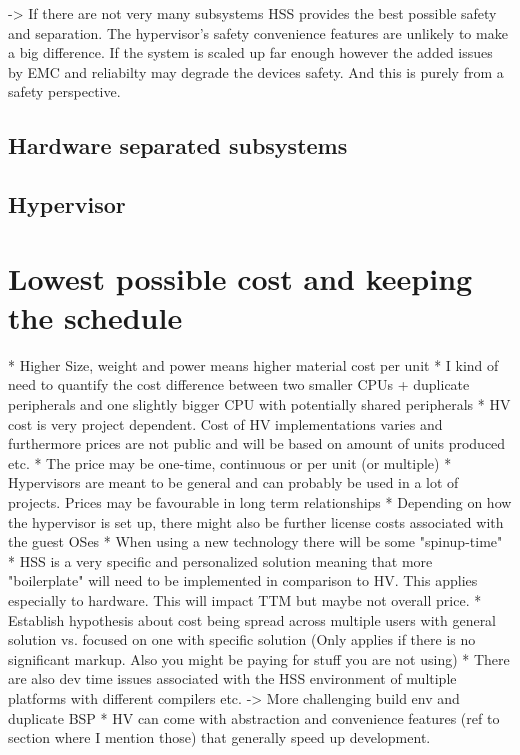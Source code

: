 -> If there are not very many subsystems HSS provides the best possible safety and separation. The hypervisor's safety convenience features are unlikely to make a big difference. If the system is scaled up far enough however the added issues by EMC and reliabilty may degrade the devices safety. And this is purely from a safety perspective.
\subsection{Hardware separated subsystems}
\subsection{Hypervisor}


\section{Lowest possible cost and keeping the schedule}
* Higher Size, weight and power means higher material cost per unit
* I kind of need to quantify the cost difference between two smaller CPUs + duplicate peripherals and one slightly bigger CPU with potentially shared peripherals
* HV cost is very project dependent. Cost of HV implementations varies and furthermore prices are not public and will be based on amount of units produced etc.
    * The price may be one-time, continuous or per unit (or multiple)
* Hypervisors are meant to be general and can probably be used in a lot of projects. Prices may be favourable in long term relationships
* Depending on how the hypervisor is set up, there might also be further license costs associated with the guest OSes 
* When using a new technology there will be some "spinup-time"
* HSS is a very specific and personalized solution meaning that more "boilerplate" will need to be implemented in comparison to HV. This applies especially to hardware. This will impact TTM but maybe not overall price.
    * Establish hypothesis about cost being spread across multiple users with general solution vs. focused on one with specific solution (Only applies if there is no significant markup. Also you might be paying for stuff you are not using)
* There are also dev time issues associated with the HSS environment of multiple platforms with different compilers etc. -> More challenging build env and duplicate BSP
* HV can come with abstraction and convenience features (ref to section where I mention those) that generally speed up development.



